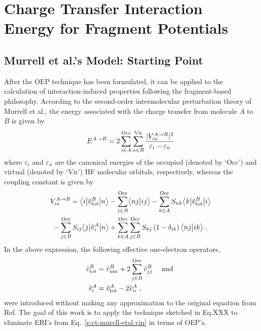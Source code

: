 \section{\label{s:34r}Charge Transfer Interaction Energy for Fragment Potentials}

\subsection{\label{s:34rg} Murrell et al.'s Model: Starting Point}

After the OEP technique has been formulated, it can be applied 
to the calculation of interaction\hyp{}induced properties following the
fragment\hyp{}based philosophy. 
According to the second\hyp{}order intermolecular perturbation theory of Murrell et al.,
the energy associated with the charge transfer from molecule $A$ to $B$ is given by
%
\begin{equation} \label{e:ct-murell-etal.e}
 E^{A\rightarrow B} = 2 \sum_{i\in A}^{\rm Occ} \sum_{n\in B}^{\rm Vir} 
  \frac{\vert V^{A\rightarrow B}_{in} \vert^2 }{\varepsilon_i - \varepsilon_n}
\end{equation}
%
%
where $\varepsilon_i$ and $\varepsilon_n$ are the canonical energies
of the occupied (denoted by `Occ') and virtual (denoted by `Vir') 
HF molecular orbitals, respectively,
whereas the coupling constant is given by
%
\begin{multline} \label{e:ct-murell-etal.vin}
 V^{A\rightarrow B}_{in} = 
        \bigl\langle {i} \bigl\lvert {\hat{v}^B_{\rm tot} } \bigl\lvert {n} \bigr\rangle 
      - \sum_{j\in B}^{\rm Occ} \bigl\langle {nj} \bigl\lvert {ij} \bigr\rangle 
      - \sum_{k\in A}^{\rm Occ} S_{nk} \bigl\langle {k} \bigl\lvert {\hat{v}^B_{\rm tot} } \bigl\lvert {i} \bigr\rangle \\
      - \sum_{j\in B}^{\rm Occ} S_{ij} \bigl\langle {j} \bigl\lvert {\hat{v}^A_{i} } \bigl\lvert {n} \bigr\rangle  
     + \sum_{k\in A}^{\rm Occ} \sum_{j\in B}^{\rm Occ}  
        S_{kj} \left( 1 - \delta_{ik} \right) 
        \bigl\langle {nj} \bigl\lvert {ik} \bigr\rangle \;.
\end{multline}
%
In the above expression, the following effective one\hyp{}electron operators,
%
\begin{subequations} 
\begin{align} \label{e:ct-murell-etal.vtot-vi}
 \hat{v}^B_{\rm tot} &= \hat{v}^B_{\rm nuc} + 2\sum_{j\in B}^{\rm Occ} \hat{v}^B_{jj} \quad\text{ and }\\ 
 \hat{v}^A_{i      } &= \hat{v}^A_{\rm tot} - 2\hat{v}^A_{ii} \;,
\end{align}
\end{subequations}
%
were introduced without making any approximation to the original equation
from Ref. 
The goal of this work is to apply the technique sketched in Eq.XXX
to eliminate ERI's from Eq.~\eqref{e:ct-murell-etal.vin} in terms of OEP's.

